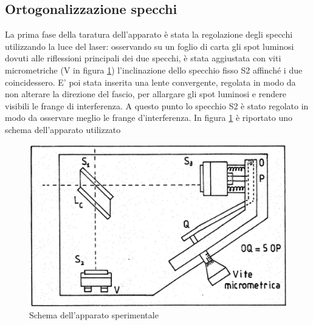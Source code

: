 \documentclass{article}
\begin{document}
\subsection{Ortogonalizzazione specchi}
    La prima fase della taratura dell'apparato è stata la regolazione degli specchi utilizzando la luce del laser: osservando su un foglio di carta gli spot luminosi dovuti alle riflessioni principali dei due specchi, è stata aggiustata con viti micrometriche (V in figura \ref{fig:apparato}) l'inclinazione dello specchio fisso S2 affinché i due coincidessero. E' poi stata inserita una lente convergente, regolata in modo da non alterare la direzione del fascio, per allargare gli spot luminosi e rendere visibili le frange di interferenza. A questo punto lo specchio S2 è stato regolato in modo da osservare meglio le frange d'interferenza. In figura \ref{fig:apparato} è riportato uno schema dell'apparato utilizzato
    \begin{figure}[h]
        \centering
        \includegraphics[scale=0.3]{../images/apparato_michelson.png}
        \caption{Schema dell'apparato sperimentale}
        \label{fig:apparato}
    \end{figure}
\end{document}
